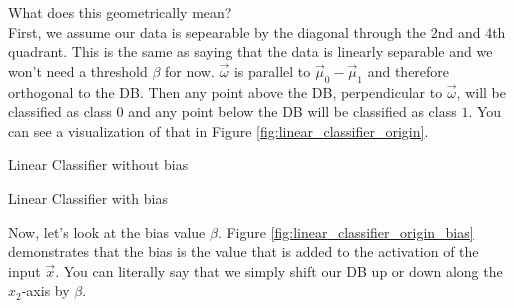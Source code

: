 What does this geometrically mean?\\
First, we assume our data is sepearable by the diagonal through the 2nd and 4th quadrant. This is the same as saying that the data is linearly separable and we won't need a threshold $\beta$ for now.
$\vec{\omega}$ is parallel to ${\vec{\mu}_0-\vec{\mu}_1}$ and therefore orthogonal to the DB.
Then any point above the DB, perpendicular to $\vec{\omega}$, will be classified as class $0$ and any point below the DB will be classified as class $1$. You can see a visualization of that in Figure \ref{fig:linear_classifier_origin}.

\begin{minipage}{.45\textwidth}
  \centering
  
  \caption{Linear Classifier without bias}
  \label{fig:linear_classifier_origin}
\end{minipage}
\hfill
\begin{minipage}{.45\textwidth}
  \centering
  
  \caption{Linear Classifier with bias}
  \label{fig:linear_classifier_origin_bias}
\end{minipage}

Now, let's look at the bias value $\beta$. Figure \ref{fig:linear_classifier_origin_bias} demonstrates that the bias is the value that is added to the activation of the input $\vec{x}$.
You can literally say that we simply shift our DB up or down along the $x_2$-axis by $\beta$.



